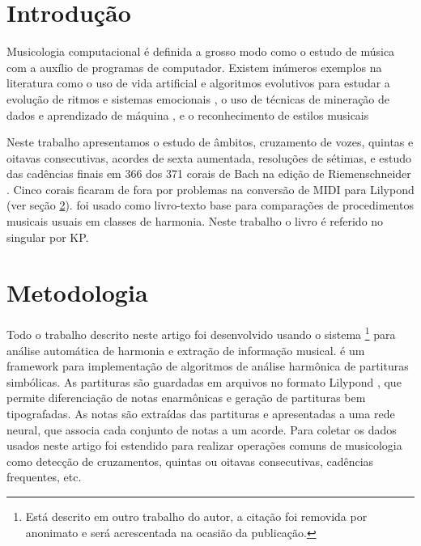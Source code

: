 \section{Introdução}
\label{sec:introducao}

Musicologia computacional é definida a grosso modo como o estudo de
música com a auxílio de programas de computador. Existem inúmeros
exemplos na literatura como o uso de vida artificial e algoritmos
evolutivos para estudar a evolução de ritmos e sistemas emocionais
\cite{coutinho05:conputational}, o uso de técnicas de mineração de
dados e aprendizado de máquina \cite{hartmann07:interactive}, e o
reconhecimento de estilos musicais 

\cite{kugel92:beyond}

\cite{honing04:comeback}

Neste trabalho apresentamos o estudo de âmbitos, cruzamento de vozes,
quintas e oitavas consecutivas, acordes de sexta aumentada, resoluções
de sétimas, e estudo das cadências finais em 366 dos 371 corais de
Bach na edição de Riemenschneider \cite{bach41:371}. Cinco corais
ficaram de fora por problemas na conversão de MIDI para Lilypond (ver
seção \ref{sec:metodologia}). \cite{kostka.ea00:tonal} foi usado como
livro-texto base para comparações de procedimentos musicais usuais em
classes de harmonia. Neste trabalho o livro é referido no singular por
KP.

\section{Metodologia}
\label{sec:metodologia}

Todo o trabalho descrito neste artigo foi desenvolvido usando o
sistema \rameau{}\footnote{Está descrito em outro trabalho do autor, a
  citação foi removida por anonimato e será acrescentada na ocasião da
  publicação.} para análise automática de harmonia e extração de
informação musical. \rameau{} é um framework para implementação de
algoritmos de análise harmônica de partituras simbólicas. As
partituras são guardadas em arquivos no formato Lilypond
\cite{nienhuys.ea08:lilypond}, que permite diferenciação de notas
enarmônicas e geração de partituras bem tipografadas. As notas são
extraídas das partituras e apresentadas a uma rede neural, que associa
cada conjunto de notas a um acorde. Para coletar os dados usados neste
artigo \rameau{} foi estendido para realizar operações comuns de
musicologia como detecção de cruzamentos, quintas ou oitavas
consecutivas, cadências frequentes, etc.

